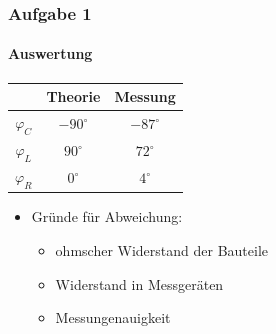\begin{frame}
\frametitle{Aufgabe 1}
\framesubtitle{Auswertung}
\begin{center}
    \begin{tabular}{c|c|c}
        & Theorie & Messung \\
        \hline
        $\varphi_C$ & $-90^{\circ}$ & $-87^{\circ} $\\
        $\varphi_L$ & $90^{\circ}$ & $72^{\circ} $\\
        $\varphi_R$ & $0^{\circ}$ & $4^{\circ} $
    \end{tabular}
\end{center}
\begin{itemize}
    \item Gründe für Abweichung:
    \begin{itemize}
        \item ohmscher Widerstand der Bauteile
        \item Widerstand in Messgeräten
        \item Messungenauigkeit
    \end{itemize}
\end{itemize}
\end{frame}
